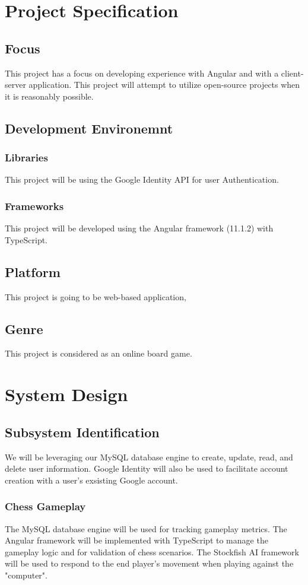\documentclass[11pt]{article}
\begin{document}
\section{Project Specification}
\label{sec:org4bce00f}
\subsection{Focus}
\label{sec:orga784189}
This project has a focus on developing experience with Angular and
with a client-server application. This project will attempt to utilize
open-source projects when it is reasonably possible.

\subsection{Development Environemnt}
\label{sec:org28ad283}
\subsubsection{Libraries}
\label{sec:org58ae02c}
This project will be using the Google Identity API for user Authentication.
\subsubsection{Frameworks}
\label{sec:org6625518}
This project will be developed using the Angular framework (11.1.2)
with TypeScript.
\subsection{Platform}
\label{sec:org7f8c0b0}
This project is going to be web-based application,
\subsection{Genre}
\label{sec:org45b583c}
This project is considered as an online board game.
\section{System Design}
\label{sec:org6453a59}
\subsection{Subsystem Identification}
\label{sec:orga8ea2ee}
We will be leveraging our MySQL database engine to create, update,
read, and delete user information.
Google Identity will also be used to facilitate account creation
with a user's exsisting Google account.
\subsubsection{Chess Gameplay}
\label{sec:org6c26c41}
The MySQL database engine will be used for tracking gameplay
metrics.
The Angular framework will be implemented with TypeScript to
manage the gameplay logic and for validation of chess scenarios.
The Stockfish AI framework will be used to respond to the end
player's movement when playing against the "computer".
\end{document}
